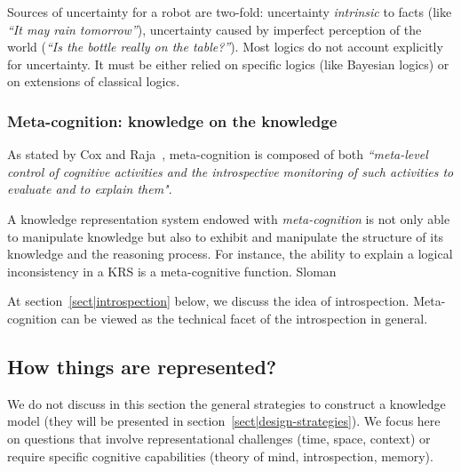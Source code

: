 Sources of uncertainty for a robot are two-fold: uncertainty \emph{intrinsic}
to facts (like \emph{``It may rain tomorrow''}), uncertainty caused by
imperfect perception of the world (\emph{``Is the bottle really on the
table?''}). Most logics do not account explicitly for uncertainty. It must be
either relied on specific logics (like Bayesian logics) or on extensions of
classical logics.

\subsubsection{Meta-cognition: knowledge on the knowledge}

As stated by Cox and Raja~\cite{Cox2007}, meta-cognition is composed of both
\emph{``meta-level control of cognitive activities and the introspective
monitoring of such activities to evaluate and to explain them"}.

A knowledge representation system endowed with \emph{meta-cognition} is not
only able to manipulate knowledge but also to exhibit and manipulate the
structure of its knowledge and the reasoning process. For instance, the ability
to explain a logical inconsistency in a KRS is a meta-cognitive function.
Sloman~\cite{Sloman2011} 

At section~\ref{sect|introspection} below, we discuss the idea of
introspection.  Meta-cognition can be viewed as the technical facet of the
introspection in general.


\subsection{How things are represented?}
\label{sect|higher-level-domain-representation}

We do not discuss in this section the general strategies to construct a
knowledge model (they will be presented in
section~\ref{sect|design-strategies}). We focus here on questions that involve
representational challenges (time, space, context) or require specific
cognitive capabilities (theory of mind, introspection, memory).

\begin{scriptsize}
\begin{center}
\end{center}
\end{scriptsize}


